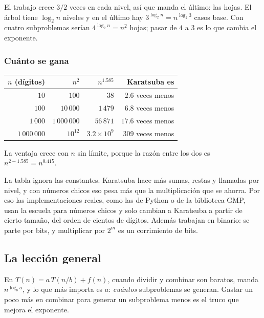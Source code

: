 \documentclass[11pt,letterpaper]{article}
\begin{document}
El trabajo crece $3/2$ veces en cada nivel, así que manda el último: las
hojas. El árbol tiene $\log_2 n$ niveles y en el último hay
$3^{\log_2 n} = n^{\log_2 3}$ casos base. Con cuatro subproblemas
serían $4^{\log_2 n} = n^2$ hojas; pasar de $4$ a $3$ es lo que cambia
el exponente.

\subsubsection*{Cuánto se gana}

\begin{center}
\begin{tabular}{rrrr}
  \toprule
  $n$ \textbf{(dígitos)} & $n^2$ & $n^{1.585}$
    & \textbf{Karatsuba es} \\
  \midrule
  $10$        & $100$         & $38$                   & $2.6$ veces menos \\
  $100$       & $10\,000$     & $1\,479$               & $6.8$ veces menos \\
  $1\,000$    & $1\,000\,000$ & $56\,871$              & $17.6$ veces menos \\
  $1\,000\,000$ & $10^{12}$   & $3.2 \times 10^{9}$    & $309$ veces menos \\
  \bottomrule
\end{tabular}
\end{center}

La ventaja crece con $n$ sin límite, porque la razón entre los dos es
$n^{2 - 1.585} = n^{0.415}$.

\begin{ojo}
  La tabla ignora las constantes. Karatsuba hace más sumas, restas y
  llamadas por nivel, y con números chicos eso pesa más que la
  multiplicación que se ahorra. Por eso las implementaciones reales,
  como las de Python o de la biblioteca GMP, usan la escuela para
  números chicos y solo cambian a Karatsuba a partir de cierto tamaño,
  del orden de cientos de dígitos. Además trabajan en binario: se parte
  por bits, y multiplicar por $2^{m}$ es un corrimiento de bits.
\end{ojo}


\subsection*{La lección general}

\begin{idea}
  En $T(n) = a\, T(n/b) + f(n)$, cuando dividir y combinar son baratos,
  manda $n^{\log_b a}$, y lo que más importa es $a$: \emph{cuántos}
  subproblemas se generan. Gastar un poco más en combinar para generar
  un subproblema menos es el truco que mejora el exponente.
\end{idea}
\end{document}
